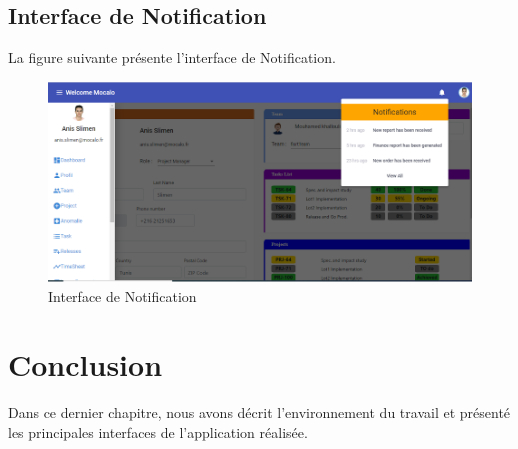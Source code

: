\subsection{	Interface de Notification }
\hspace{4mm}La figure suivante présente l’interface de Notification.
\begin{figure}[h]
    \centering
    \includegraphics{figures/33anis3'.png}
    \caption{Interface de Notification}
    \label{fig:interface_notification}
\end{figure}
\section*{	Conclusion}
\hspace{4mm} 
Dans ce dernier chapitre, nous avons décrit l'environnement du travail et présenté les principales interfaces de l'application réalisée.
